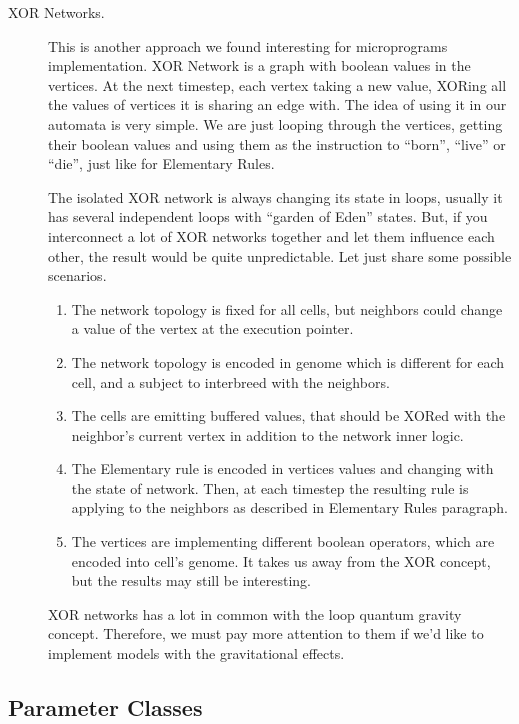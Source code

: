 \documentclass[a4paper,12pt,tikz,UTF8]{article}
\begin{document}
\begin{description}
      \item [XOR Networks.] This is another approach we found interesting for microprograms implementation. XOR Network is a graph with boolean values in the vertices. At the next timestep, each vertex taking a new value, XORing all the values of vertices it is sharing an edge with. The idea of using it in our automata is very simple. We are just looping through the vertices, getting their boolean values and using them as the instruction to ``born'', ``live'' or ``die'', just like for Elementary Rules.

        The isolated XOR network is always changing its state in loops, usually it has several independent loops with ``garden of Eden'' states. But, if you interconnect a lot of XOR networks together and let them influence each other, the result would be quite unpredictable. Let just share some possible scenarios.
        \begin{enumerate}
          \item The network topology is fixed for all cells, but neighbors could change a value of the vertex at the execution pointer. 
          \item The network topology is encoded in genome which is different for each cell, and a subject to interbreed with the neighbors.
          \item The cells are emitting buffered values, that should be XORed with the neighbor's current vertex in addition to the network inner logic.
          \item The Elementary rule is encoded in vertices values and changing with the state of network. Then, at each timestep the resulting rule is applying to the neighbors as described in Elementary Rules paragraph.
          \item The vertices are implementing different boolean operators, which are encoded into cell's genome. It takes us away from the XOR concept, but the results may still be interesting.
        \end{enumerate}

        XOR networks has a lot in common with the loop quantum gravity concept. Therefore, we must pay more attention to them if we'd like to implement models with the gravitational effects.

    \end{description}

  \subsection{Parameter Classes}
\end{document}
